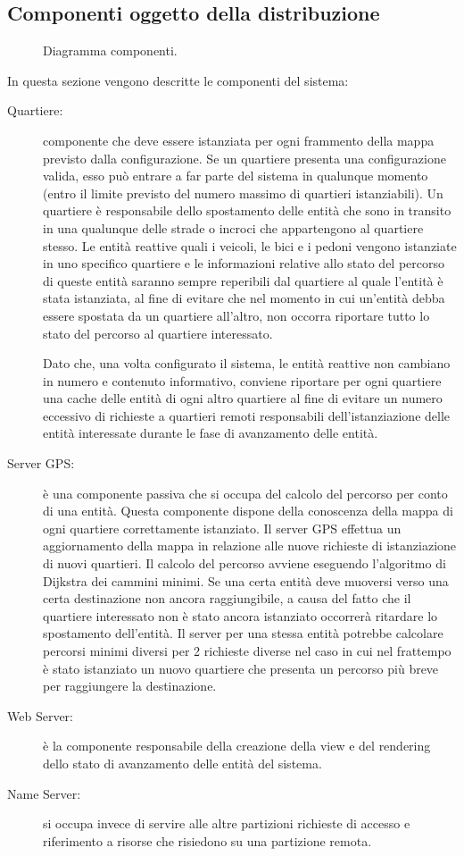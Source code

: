 \subsection{Componenti oggetto della distribuzione}\label{subsec:distribuzione}
\begin{figure}[H] %
\caption{Diagramma componenti.}
\label{fig:Diagramma componenti}
\end{figure}
In questa sezione vengono descritte le componenti del sistema:
\begin{description}
\item[Quartiere:] componente che deve essere istanziata per ogni frammento della
mappa previsto dalla configurazione. Se un quartiere presenta una configurazione
valida, esso può entrare a far parte del sistema in qualunque momento (entro il
limite previsto del numero massimo di quartieri istanziabili).
Un quartiere è responsabile dello spostamento delle entità che sono in transito
in una qualunque delle strade o incroci che appartengono al quartiere stesso. Le
entità reattive quali i veicoli, le bici e i pedoni vengono istanziate in uno
specifico quartiere e le informazioni relative allo stato del percorso di queste
entità saranno sempre reperibili dal quartiere al quale l'entità è stata
istanziata, al fine di evitare che nel momento in cui un'entità debba essere
spostata da un quartiere all'altro, non occorra riportare tutto lo stato del
percorso al quartiere interessato.

Dato che, una volta configurato il sistema, le entità reattive non cambiano in
numero e contenuto informativo, conviene riportare per ogni quartiere una cache
delle entità di ogni altro quartiere al fine di evitare un numero eccessivo di
richieste a quartieri remoti responsabili dell'istanziazione delle entità
interessate durante le fase di avanzamento delle entità.
\item[Server GPS:] è una componente passiva che si occupa del calcolo del
percorso per conto di una entità. Questa componente dispone della conoscenza
della mappa di ogni quartiere correttamente istanziato. Il server GPS effettua
un aggiornamento della mappa in relazione alle nuove richieste di istanziazione
di nuovi quartieri. Il calcolo del percorso avviene eseguendo l'algoritmo di
Dijkstra dei cammini minimi. Se una certa entità deve muoversi verso una certa
destinazione non ancora raggiungibile, a causa del fatto che il quartiere
interessato non è stato ancora istanziato occorrerà ritardare lo spostamento
dell'entità. Il server per una stessa entità potrebbe calcolare percorsi minimi
diversi per 2 richieste diverse nel caso in cui nel frattempo è stato istanziato
un nuovo quartiere che presenta un percorso più breve per raggiungere la
destinazione.
\item[Web Server:] è la componente responsabile della creazione della view e
del rendering dello stato di avanzamento delle entità del sistema.
\item[Name Server:] si occupa invece di servire alle altre partizioni richieste
di accesso e riferimento a risorse che risiedono su una partizione remota.
\end{description}
